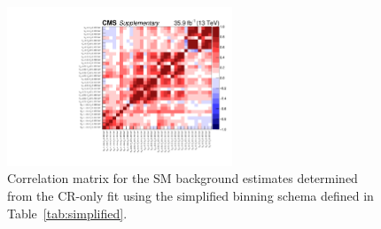 \begin{table}[!t]
\begin{tabular}{rrlr@{}lr@{}lr@{}lr@{}l}
  \end{tabular}
\end{table}
\endgroup

\begin{figure}[!b]
  \centering
  \includegraphics[width=0.6\textwidth]{Figures/correlation.pdf}
  \caption{Correlation matrix for the SM background estimates
    determined from the CR-only fit using the simplified binning
    schema defined in Table~\ref{tab:simplified}.}
  \label{fig:correlation}
\end{figure} 

